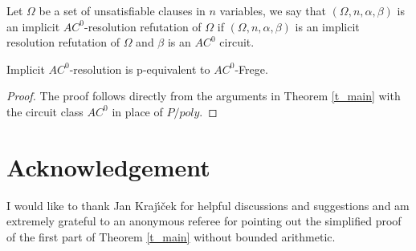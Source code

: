 \documentclass{LMCS}
\theoremstyle{plain}\newtheorem{satz}[thm]{Satz}
\begin{document}
\begin{defi}
Let $\Omega$ be a set of unsatisfiable clauses in $n$ variables, we say that $(\Omega,n,\alpha,\beta)$ is an implicit $AC^0$-resolution refutation of $\Omega$ if $(\Omega,n,\alpha,\beta)$ is an implicit resolution refutation of $\Omega$ and $\beta$ is an $AC^0$ circuit.
\end{defi}

\begin{thm}
Implicit $AC^0$-resolution is p-equivalent to $AC^0$-Frege.
\begin{proof}
The proof follows directly from the arguments in Theorem \ref{t_main} with the circuit class $AC^0$ in place of $P/poly$.
\end{proof}
\end{thm}

\section*{Acknowledgement}
I would like to thank Jan Kraj{\'{\i}}{\v{c}}ek for helpful discussions and suggestions and am extremely grateful to an anonymous referee for pointing out the simplified proof of the first part of Theorem \ref{t_main} without bounded arithmetic.





\end{document}
